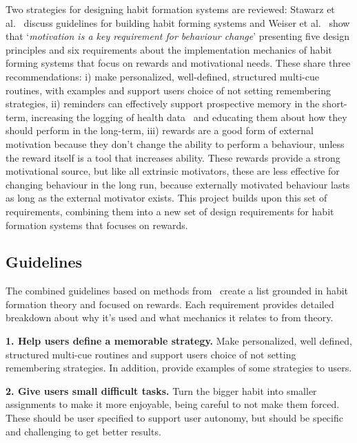 Two strategies for designing habit formation systems are reviewed: Stawarz et al.~\cite{article_beyond_self_tracking_designing_apps} discuss guidelines for building habit forming systems and Weiser et al.~\cite{article_taxonomy_motivational_affordances_meaningful} show that `\textit{motivation is a key requirement for behaviour change}' presenting five design principles and six requirements about the implementation mechanics of habit forming systems that focus on rewards and motivational needs. These share three recommendations: i) make personalized, well-defined, structured multi-cue routines, with examples and support users choice of not setting remembering strategies, ii) reminders can effectively support prospective memory in the short-term, increasing the logging of health data~\cite{the_power_of_logging_mobile_notifications} and educating them about how they should perform in the long-term, iii) rewards are a good form of external motivation because they don't change the ability to perform a behaviour, unless the reward itself is a tool that increases ability. These rewards provide a strong motivational source, but like all extrinsic motivators, these are less effective for changing behaviour in the long run, because externally motivated behaviour lasts as long as the external motivator exists. This project builds upon this set of requirements, combining them into a new set of design requirements for habit formation systems that focuses on rewards.

\subsection{Guidelines} \label{recommendations}
The combined guidelines based on methods from~\cite{thesis_kathy, article_taxonomy_motivational_affordances_meaningful} create a list grounded in habit formation theory and focused on rewards. Each requirement provides detailed breakdown about why it's used and what mechanics it relates to from theory.


\textbf{1. Help users define a memorable strategy.}\newline
Make personalized, well defined, structured multi-cue routines and support users choice of not setting remembering strategies. In addition, provide examples of some strategies to users.


\textbf{2. Give users small difficult tasks.}\newline
Turn the bigger habit into smaller assignments to make it more enjoyable, being careful to not make them forced. These should be user specified to support user autonomy, but should be specific and challenging to get better results.


